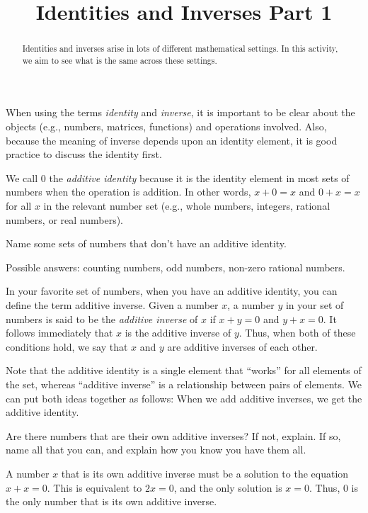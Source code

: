 \documentclass{ximera}
\title{Identities and Inverses Part 1}
\begin{document}
\begin{abstract}
Identities and inverses arise in lots of different mathematical
settings.  In this activity, we aim to see what is the same across
these settings.
\end{abstract}
\maketitle


%
%
When using the terms \emph{identity} and \emph{inverse}, it is
important to be clear about the objects (e.g., numbers, matrices,
functions) and operations involved.  Also, because the meaning of
inverse depends upon an identity element, it is good practice to
discuss the identity first.

We call $0$ the \emph{additive identity} because it is the identity
element in most sets of numbers when the operation is addition.  In
other words, $x+0=x$ and $0+x=x$ for all $x$ in the relevant number
set (e.g., whole numbers, integers, rational numbers, or real
numbers).
\begin{question}
Name some sets of numbers that don't have an additive identity.
\begin{freeResponse}
Possible answers: counting numbers, odd numbers, non-zero rational
numbers.
\end{freeResponse}
\end{question}

In your favorite set of numbers, when you have an additive identity,
you can define the term additive inverse.  Given a number $x$, a
number $y$ in your set of numbers is said to be the \emph{additive
  inverse} of $x$ if $x+y=0$ and $y+x=0$.  It follows immediately that
$x$ is the additive inverse of $y$.  Thus, when both of these
conditions hold, we say that $x$ and $y$ are additive inverses of each
other.

Note that the additive identity is a single element that ``works'' for
all elements of the set, whereas ``additive inverse'' is a
relationship between pairs of elements.  We can put both ideas
together as follows: When we add additive inverses, we get the
additive identity.

\begin{question}
Are there numbers that are their own additive inverses?  If not,
explain.  If so, name all that you can, and explain how you know you
have them all.
\begin{freeResponse}
A number $x$ that is its own additive inverse must be a solution to
the equation $x+x = 0$.  This is equivalent to $2x=0$, and the only
solution is $x=0$.  Thus, 0 is the only number that is its own
additive inverse.
\end{freeResponse}
\end{question}
\end{document}
